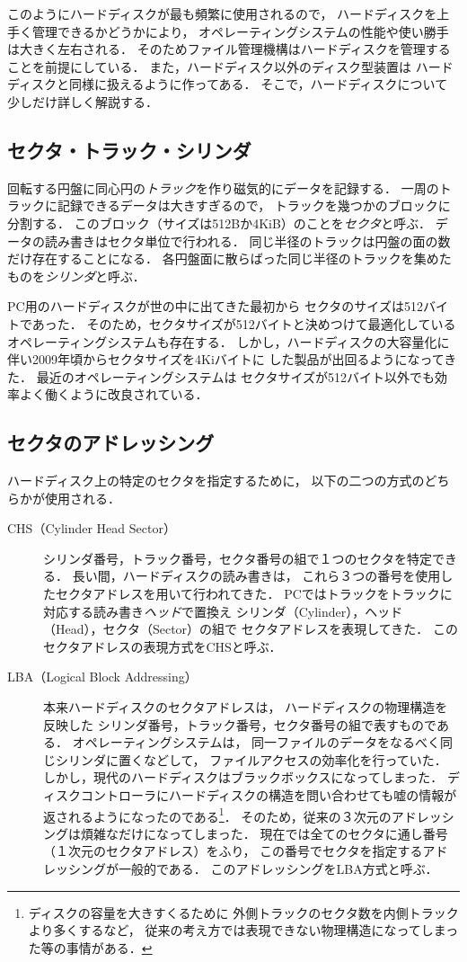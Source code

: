 このようにハードディスクが最も頻繁に使用されるので，
ハードディスクを上手く管理できるかどうかにより，
オペレーティングシステムの性能や使い勝手は大きく左右される．
そのためファイル管理機構はハードディスクを管理することを前提にしている．
また，ハードディスク以外のディスク型装置は
ハードディスクと同様に扱えるように作ってある．
そこで，ハードディスクについて少しだけ詳しく解説する．

\subsection{セクタ・トラック・シリンダ}
回転する円盤に同心円の\emph{トラック}を作り磁気的にデータを記録する．
一周のトラックに記録できるデータは大きすぎるので，
トラックを幾つかのブロックに分割する．
このブロック（サイズは512Bか4KiB）のことを\emph{セクタ}と呼ぶ．
データの読み書きはセクタ単位で行われる．
同じ半径のトラックは円盤の面の数だけ存在することになる．
各円盤面に散らばった同じ半径のトラックを集めたものを\emph{シリンダ}と呼ぶ．

PC用のハードディスクが世の中に出てきた最初から
セクタのサイズは512バイトであった．
そのため，セクタサイズが512バイトと決めつけて最適化している
オペレーティングシステムも存在する．
しかし，ハードディスクの大容量化に伴い2009年頃からセクタサイズを4Kiバイトに
した製品が出回るようになってきた．
最近のオペレーティングシステムは
セクタサイズが512バイト以外でも効率よく働くように改良されている．

\subsection{セクタのアドレッシング}
ハードディスク上の特定のセクタを指定するために，
以下の二つの方式のどちらかが使用される．

\begin{description}
\item[CHS（Cylinder Head Sector）]
  シリンダ番号，トラック番号，セクタ番号の組で１つのセクタを特定できる．
  長い間，ハードディスクの読み書きは，
  これら３つの番号を使用したセクタアドレスを用いて行われてきた．
  PCではトラックをトラックに対応する読み書き\emph{ヘッド}で置換え
  シリンダ（Cylinder），ヘッド（Head），セクタ（Sector）の組で
  セクタアドレスを表現してきた．
  このセクタアドレスの表現方式をCHSと呼ぶ．
\item[LBA（Logical Block Addressing）]
  本来ハードディスクのセクタアドレスは，
  ハードディスクの物理構造を反映した
  シリンダ番号，トラック番号，セクタ番号の組で表すものである．
  オペレーティングシステムは，
  同一ファイルのデータをなるべく同じシリンダに置くなどして，
  ファイルアクセスの効率化を行っていた．
  しかし，現代のハードディスクはブラックボックスになってしまった．
  ディスクコントローラにハードディスクの構造を問い合わせても嘘の情報が
  返されるようになったのである\footnote{
    ディスクの容量を大きすくるために
    外側トラックのセクタ数を内側トラックより多くするなど，
    従来の考え方では表現できない物理構造になってしまった等の事情がある．}．
  そのため，従来の３次元のアドレッシングは煩雑なだけになってしまった．
  現在では全てのセクタに通し番号（１次元のセクタアドレス）をふり，
  この番号でセクタを指定するアドレッシングが一般的である．
  このアドレッシングをLBA方式と呼ぶ．
\end{description}

